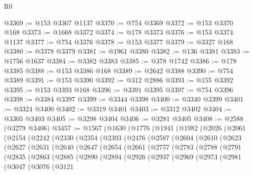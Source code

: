 \begin{lexlean}{R0}
\begin{coremodule}
@3369 := @153 @3367 @1137
@3370 := @754 @3369
@3372 := @153 @3370 @168
@3373 := @1668 @3372
@3374 := @178 @3373
@3376 := @153 @3374 @1137
@3377 := @754 @3376
@3378 := @153 @3377
@3379 := @3327 @168
@3380 := @3378 @3379
@3381 := @1961 @3380
@3382 := @136 @3381
@3383 := @1756 @1637
@3384 := @3382 @3383
@3385 := @378 @1742
@3386 := @178 @3385
@3388 := @153 @3386 @168
@3389 := @2642 @3388
@3390 := @754 @3389
@3391 := @153 @3390
@3392 := @312 @2886
@3393 := @155 @3392
@3395 := @153 @3393 @168
@3396 := @3391 @3395
@3397 := @754 @3396
@3398 := @3384 @3397
@3399 := @3344 @3398
@3400 := @3340 @3399
@3401 := @3324 @3400
@3402 := @3319 @3401
@3403 := @3312 @3402
@3404 := @3305 @3403
@3405 := @3298 @3404
@3406 := @3281 @3405
@3408 := @2588 (@3279 @3406)
@3457 := @1567
    (@1630
      (@1776
        (@1941
          (@1982
            (@2026
              (@2061
                (@2154
                  (@2242
                    (@2330
                      (@2354
                        (@2393
                          (@2476
                            (@2587
                              (@2604
                                (@2610
                                  (@2623
                                    (@2627
                                      (@2631
                                        (@2640
                                          (@2647
                                            (@2654
                                              (@2661
                                                (@2757
                                                  (@2783
                                                    (@2788
                                                      (@2791
                                                        (@2835
                                                          (@2863
                                                            (@2885
                                                              (@2890
                                                                (@2894
                                                                  (@2926
                                                                    (@2937
                                                                      (@2969
                                                                        (@2973
                                                                          (@2981
                                                                            (@3047
                                                                              (@3076
                                                                                (@3121

\end{coremodule}
\end{lexlean}
